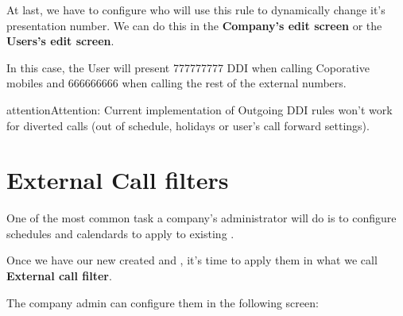 \documentclass[letterpaper,10pt,english]{sphinxmanual}
\begin{document}
At last, we have to configure who will use this rule to dynamically change it's
presentation number. We can do this in the \textbf{Company's edit screen} or the
\textbf{Users's edit screen}.


In this case, the User will present 777777777 DDI when calling Coporative mobiles
and 666666666 when calling the rest of the external numbers.

\begin{notice}{attention}{Attention:}
Current implementation of Outgoing DDI rules won't work for
diverted calls (out of schedule, holidays or user's call forward settings).
\end{notice}


\section{External Call filters}
\label{company/external_filters:external-call-filters}\label{company/external_filters:external-filters}\label{company/external_filters::doc}
One of the most common task a company's administrator will do is to
configure schedules and calendards to apply to existing {\hyperref[company/ddis:ddis]{}}.

Once we have our new created {\hyperref[company/schedules:schedules]{}} and {\hyperref[company/calendars:calendars]{}}, it's time to apply them
in what we call \textbf{External call filter}.

The company admin can configure them in the following screen:
\end{document}
